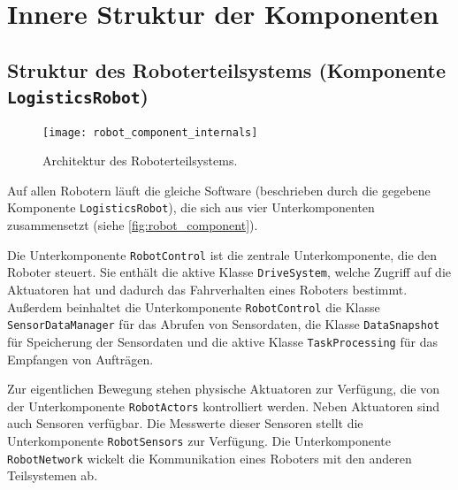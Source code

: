 
\section{Innere Struktur der Komponenten}
\label{sec:struktur}


\subsection{Struktur des Roboterteilsystems (Komponente \texttt{LogisticsRobot})}

\begin{figure}[h]
	\centering
	\texttt{[image: robot\_component\_internals]}
	\caption{Architektur des Roboterteilsystems.}
	\label{fig:robot_component}
\end{figure}



Auf allen Robotern läuft die gleiche Software (beschrieben durch die gegebene Komponente \texttt{LogisticsRobot}), die sich aus vier Unterkomponenten zusammensetzt (siehe \autoref{fig:robot_component}).

Die Unterkomponente \texttt{RobotControl} ist die zentrale Unterkomponente, die den Roboter steuert. 
Sie enthält die aktive Klasse \texttt{DriveSystem}, welche Zugriff auf die Aktuatoren hat und dadurch das Fahrverhalten eines Roboters bestimmt.
Außerdem beinhaltet die Unterkomponente \texttt{RobotControl} die Klasse \texttt{SensorDataManager} für das Abrufen von Sensordaten, die Klasse \texttt{DataSnapshot} für Speicherung der Sensordaten und die aktive Klasse \texttt{TaskProcessing} für das Empfangen von Aufträgen.


Zur eigentlichen Bewegung stehen physische Aktuatoren zur Verfügung, die von der Unterkomponente \texttt{RobotActors} kontrolliert werden.
Neben Aktuatoren sind auch Sensoren verfügbar. 
Die Messwerte dieser Sensoren stellt die Unterkomponente \texttt{RobotSensors} zur Verfügung.
Die Unterkomponente \texttt{RobotNetwork} wickelt die Kommunikation eines Roboters mit den anderen Teilsystemen ab.